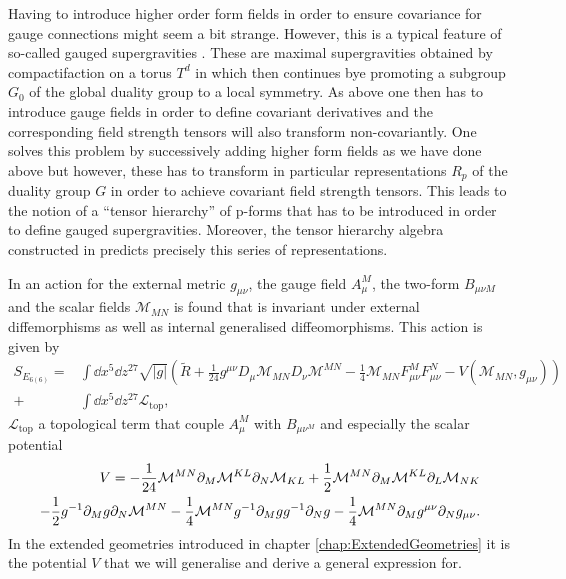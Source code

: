 Having to introduce higher order form fields in order to ensure covariance for gauge connections might seem a bit strange. However, this is a typical feature of so-called gauged supergravities \cite{deWitTensorHierarchies2008}. These are maximal supergravities obtained by compactifaction on a torus $T^d$ in which then continues bye promoting a subgroup $G_0$ of the global duality group to a local symmetry. As above one then has to introduce gauge fields in order to define covariant derivatives and the corresponding field strength tensors will also transform non-covariantly. One solves this problem by successively adding higher form fields as we have done above but however, these has to transform in particular representations $R_p$ of the duality group $G$ in order to achieve covariant field strength tensors. This leads to the notion of a ``tensor hierarchy'' of p-forms that has to be introduced in order to define gauged supergravities. Moreover, the tensor hierarchy algebra constructed in \cite{Palmkvist:2013vya} predicts precisely this series of representations.

In \cite{E62014} an action for the external metric $g_{\mu\nu}$, the gauge field $A^M_\mu$, the two-form $B_{\mu\nu M}$ and the scalar fields $\mathcal{M}_{MN}$ is found that is invariant under external diffemorphisms as well as internal generalised diffeomorphisms. This action is given by 
\begin{equation}\label{eq:E6Action}\begin{aligned}
    S_{E_{6(6)}} = &\int \dd x^5\dd z^{27} \sqrt{|g|}\left(\tilde{R}+\frac{1}{24}g^{\mu\nu}D_\mu \mathcal{M}_{MN}D_\nu\mathcal{M}^{MN}-\frac{1}{4}\mathcal{M}_{MN}F^M_{\mu\nu}F^N_{\mu\nu}-V(\mathcal{M}_{MN},g_{\mu\nu})\right)\\
    +&\int \dd x^5\dd z^{27}\mathcal{L}_{\text{top}},
    \end{aligned}
\end{equation}
$\mathcal{L}_{\text{top}}$ a topological term that couple $A_\mu^M$ with $B_{\mu\nu^M}$ and especially the scalar potential 
\begin{equation}
    \begin{aligned}
    V = -\frac{1}{24}\mathcal{M}^{MN}\partial_M\mathcal{M}^{KL}\partial_N\mathcal{M}_{KL}+\frac{1}{2}\mathcal{M}^{MN}\partial_M\mathcal{M}^{KL}\partial_L\mathcal{M}_{NK}\\
    -\frac{1}{2}g^{-1}\partial_M g\partial_N\mathcal{M}^{MN}-\frac{1}{4}\mathcal{M}^{MN}g^{-1}\partial_Mgg^{-1}\partial_Ng-\frac{1}{4}\mathcal{M}^{MN}\partial_Mg^{\mu\nu}\partial_Ng_{\mu\nu}. 
    \end{aligned}
\end{equation}
In the extended geometries introduced in chapter \ref{chap:ExtendedGeometries} it is the potential $V$ that we will generalise and derive a general expression for. 


